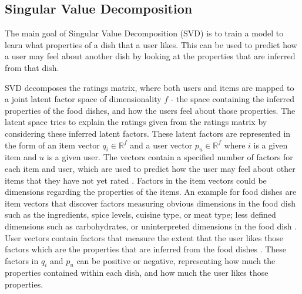 
\subsection{Singular Value Decomposition}

The main goal of Singular Value Decomposition (SVD) is to train a model to learn what properties of a dish that a user likes. This can be used to predict how a user may feel about another dish by looking at the properties that are inferred from that dish.

SVD decomposes the ratings matrix, where both users and items are mapped to a joint latent factor space of dimensionality \begin{math} f \end{math} - the space containing the inferred properties of the food dishes, and how the users feel about those properties. The latent space tries to explain the ratings given from the ratings matrix by considering these inferred latent factors. These latent factors are represented in the form of an item vector \begin{math} q_{i} \in \mathbb{R}^f  \end{math} and a user vector \begin{math} p_{u} \in \mathbb{R}^f  \end{math} where \begin{math} i \end{math} is a given item and \begin{math} u \end{math} is a given user. The vectors contain a specified number of factors for each item and user, which are used to predict how the user may feel about other items that they have not yet rated \cite{koren2009matrix}. Factors in the item vectors could be dimensions regarding the properties of the items. An example for food dishes are item vectors that discover factors measuring obvious dimensions in the food dish such as the ingredients, spice levels, cuisine type, or meat type; less defined dimensions such as carbohydrates, or uninterpreted dimensions in the food dish \cite{koren2009matrix}. User vectors contain factors that measure the extent that the user likes those factors which are the properties that are inferred from the food dishes \cite{koren2009matrix}. These factors in \begin{math} q_{i} \end{math} and \begin{math} p_{u} \end{math} can be positive or negative, representing how much the properties contained within each dish, and how much the user likes those properties. 

